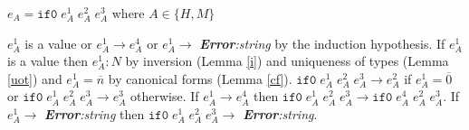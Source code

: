 \begin{case}
$e_{A}=\mathtt{if0}\;e_{A}^{1}\;e_{A}^{2}\;e_{A}^{3}$ where $A\in\lbrace H,M\rbrace$

$e_{A}^{1}$ is a value or $e_{A}^{1}\rightarrow e_{A}^{4}$ or $e_{A}^{1}\rightarrow$ \emph{\textbf{Error}:\;string} by the induction hypothesis.  If $e_{A}^{1}$ is a value then $e_{A}^{1}:N$ by inversion (Lemma \ref{i}) and uniqueness of types (Lemma \ref{uot}) and $e_{A}^{1}=\overline{n}$ by canonical forms (Lemma \ref{cf}).  $\mathtt{if0}\;e_{A}^{1}\;e_{A}^{2}\;e_{A}^{3}\rightarrow e_{A}^{2}$ if $e_{A}^{1}=\overline{0}$ or $\mathtt{if0}\;e_{A}^{1}\;e_{A}^{2}\;e_{A}^{3}\rightarrow e_{A}^{3}$ otherwise.  If $e_{A}^{1}\rightarrow e_{A}^{4}$ then $\mathtt{if0}\;e_{A}^{1}\;e_{A}^{2}\;e_{A}^{3}\rightarrow \mathtt{if0}\;e_{A}^{4}\;e_{A}^{2}\;e_{A}^{3}$.  If $e_{A}^{1}\rightarrow$ \emph{\textbf{Error}:\;string} then $\mathtt{if0}\;e_{A}^{1}\;e_{A}^{2}\;e_{A}^{3}\rightarrow$ \emph{\textbf{Error}:\;string}.
\end{case}